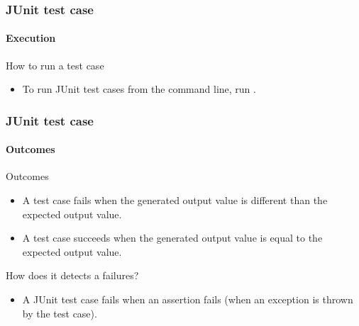 \begin{frame}
\frametitle{JUnit test case}
\framesubtitle{Execution}
\label{procedure:junit-test-case:execution}

\begin{block:procedure}{How to run a test case}
\begin{itemize}
	\item To run JUnit test cases from the command line, run
	.
\end{itemize}
\end{block:procedure}

\hfill
{}
\end{frame}



\begin{frame}[hasprev=true, hasnext=false]
\frametitle{JUnit test case}
\framesubtitle{Outcomes}
\label{fact:junit-test-case:outcomes}


\begin{block:fact}{Outcomes}
\begin{itemize}
	\item A test case fails when the generated output value is different than
	the expected output value.

	\item A test case succeeds when the generated output value is equal to the
	expected output value.
\end{itemize}
\end{block:fact}


\begin{block:fact}{How does it detects a failures?}
\begin{itemize}
	\item A JUnit test case fails when an assertion fails (when an
	 exception is thrown by the test case).
\end{itemize}
\end{block:fact}

\hfill
{}
\end{frame}